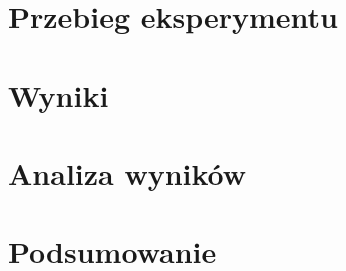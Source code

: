\documentclass{article}
\begin{document}
	\newpage
	\section{Przebieg eksperymentu}
	
	\section{Wyniki}
	
	\section{Analiza wyników}
	
	\section{Podsumowanie}
	
	\newpage
	
	
\end{document}
